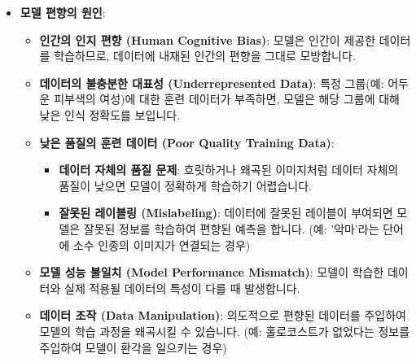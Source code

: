 \documentclass[11pt,a4paper]{article}
\begin{document}
\begin{itemize}
\begin{itemize}
    \begin{itemize}
        \item \textbf{모델 편향의 원인}:
        \begin{itemize}
            \item \textbf{인간의 인지 편향 (Human Cognitive Bias)}: 모델은 인간이 제공한 데이터를 학습하므로, 데이터에 내재된 인간의 편향을 그대로 모방합니다.
            \item \textbf{데이터의 불충분한 대표성 (Underrepresented Data)}: 특정 그룹(예: 어두운 피부색의 여성)에 대한 훈련 데이터가 부족하면, 모델은 해당 그룹에 대해 낮은 인식 정확도를 보입니다.
            \item \textbf{낮은 품질의 훈련 데이터 (Poor Quality Training Data)}:
            \begin{itemize}
                \item \textbf{데이터 자체의 품질 문제}: 흐릿하거나 왜곡된 이미지처럼 데이터 자체의 품질이 낮으면 모델이 정확하게 학습하기 어렵습니다.
                \item \textbf{잘못된 레이블링 (Mislabeling)}: 데이터에 잘못된 레이블이 부여되면 모델은 잘못된 정보를 학습하여 편향된 예측을 합니다. (예: '악마'라는 단어에 소수 인종의 이미지가 연결되는 경우)
            \end{itemize}
            \item \textbf{모델 성능 불일치 (Model Performance Mismatch)}: 모델이 학습한 데이터와 실제 적용될 데이터의 특성이 다를 때 발생합니다.
            \item \textbf{데이터 조작 (Data Manipulation)}: 의도적으로 편향된 데이터를 주입하여 모델의 학습 과정을 왜곡시킬 수 있습니다. (예: 홀로코스트가 없었다는 정보를 주입하여 모델이 환각을 일으키는 경우)
        \end{itemize}


\end{itemize}
\end{itemize}
\end{itemize}
\end{document}

